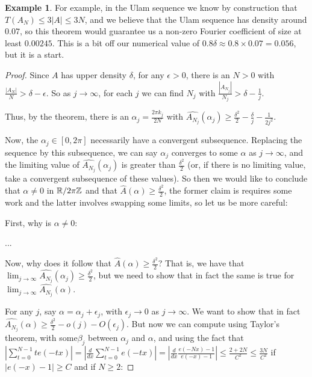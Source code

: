 \documentclass{article}
\theoremstyle{definition}
\newtheorem{example}{Example}
\theoremstyle{remark}
\numberwithin{equation}{section}
\begin{document}
\begin{example}
  For example, in the Ulam sequence we know by construction that
  $T(A_N) \leq 3|A| \leq 3N$, and we believe that the Ulam sequence
  has density around $0.07$, so this theorem would guarantee us a
  non-zero Fourier coefficient of size at least $0.00245$.  This is a
  bit off our numerical value of
  $0.8\delta \approx 0.8 \times 0.07 = 0.056$, but it is a start.
\end{example}

\begin{proof}Since $A$ has upper density $\delta$, for any
  $\epsilon > 0$, there is an $N > 0$ with
  $\frac{|A_N|}{N} > \delta-\epsilon$.  So as $j \to \infty$, for each
  $j$ we can find $N_j$ with
  $\frac{|A_{N_j}|}{N_j} > \delta-\frac{1}{j}$.

  Thus, by the theorem, there is an $\alpha_j = \frac{2\pi k_j}{2N}$
  with
  $\widehat{A_{N_j}}(\alpha_j) \geq
  \frac{\delta^2}{2}-\frac{\delta}{j} - \frac{1}{2j^2}$.

  Now, the $\alpha_j \in [0,2\pi]$ necessarily have a convergent
  subsequence.  Replacing the sequence by this subsequence, we can say
  $\alpha_j$ converges to some $\alpha$ as $j \to \infty$, and the
  limiting value of $\widehat{A_{N_j}}(\alpha_j)$ is greater than
  $\frac{\delta^2}{2}$ (or, if there is no limiting value, take a
  convergent subsequence of these values).  So then we would like to
  conclude that $\alpha \neq 0$ in $\mathbb{R}/2\pi\mathbb{Z}$ and that
  $\widehat{A}(\alpha) \geq \frac{\delta^2}{2}$, the former claim is
  requires some work and the latter involves swapping some limits, so
  let us be more careful:

  First, why is $\alpha \neq 0$: 

  ...

  Now, why does it follow that
  $\widehat{A}(\alpha) \geq \frac{\delta^2}{2}$?  That is, we have
  that
  $\lim_{j \to \infty} \widehat{A_{N_j}}(\alpha_j) \geq
  \frac{\delta^2}{2}$, but we need to show that in fact the same is
  true for $\lim_{j \to \infty} \widehat{A_{N_j}}(\alpha)$.

  For any $j$, say $\alpha = \alpha_j + \epsilon_j$, with
  $\epsilon_j \to 0$ as $j \to \infty$.  We want to show that in fact
  $\widehat{A_{N_j}}(\alpha) \geq \frac{\delta^2}{2} - o(j) -
  O(\epsilon_j)$.  But now we can compute using Taylor's theorem, with
  some$\beta_j$ between $\alpha_j$ and $\alpha$, and using the fact
  that
  $\left|\sum_{t=0}^{N-1} t e(-tx)\right| =
  \left|\frac{d}{dx}\sum_{t=0}^{N-1} e(-tx)\right| =
  \left|\frac{d}{dx} \frac{e(-Nx) -1}{e(-x)-1}\right| \leq
  \frac{2+2N}{C^2} \leq \frac{3N}{C^2}$ if $|e(-x)-1| \geq C$ and if
  $N \geq 2$:


\end{proof}
\end{document}
